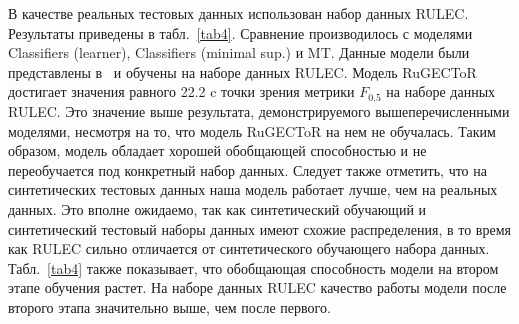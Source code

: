 В качестве реальных тестовых данных использован набор данных RULEC. Результаты приведены в табл.~\ref{tab4}. Сравнение производилось с моделями Classifiers (learner), Classifiers (minimal sup.) и MT. Данные модели были представлены в~\cite{b12} и обучены на наборе данных RULEC. Модель RuGECToR достигает значения равного 22.2 c точки зрения метрики $F_{0.5}$ на наборе данных RULEC. Это значение выше результата, демонстрируемого вышеперечисленными моделями, несмотря на то, что модель RuGECToR на нем не обучалась. Таким образом, модель обладает хорошей обобщающей способностью и не переобучается под конкретный набор данных. Следует также отметить, что на синтетических тестовых данных наша модель работает лучше, чем на реальных данных. Это вполне ожидаемо, так как синтетический обучающий и синтетический тестовый наборы данных имеют схожие распределения, в то время как RULEC сильно отличается от синтетического обучающего набора данных. Табл.~\ref{tab4} также показывает, что обобщающая способность модели на втором этапе обучения растет. На наборе данных RULEC качество работы модели после второго этапа значительно выше, чем после первого.
